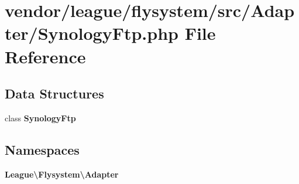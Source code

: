 \section{vendor/league/flysystem/src/\+Adapter/\+Synology\+Ftp.php File Reference}
\label{_synology_ftp_8php}
\subsection*{Data Structures}
\begin{DoxyCompactItemize}
\item 
class {\bf Synology\+Ftp}
\end{DoxyCompactItemize}
\subsection*{Namespaces}
\begin{DoxyCompactItemize}
\item 
 {\bf League\textbackslash{}\+Flysystem\textbackslash{}\+Adapter}
\end{DoxyCompactItemize}
